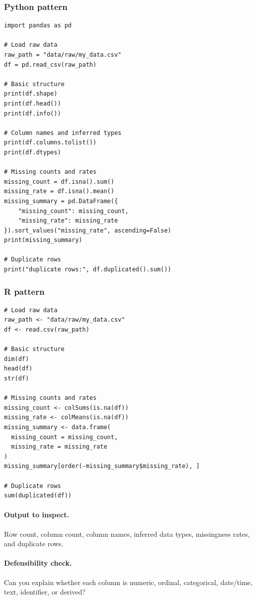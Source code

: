 \subsubsection*{Python pattern}

\begin{verbatim}
import pandas as pd

# Load raw data
raw_path = "data/raw/my_data.csv"
df = pd.read_csv(raw_path)

# Basic structure
print(df.shape)
print(df.head())
print(df.info())

# Column names and inferred types
print(df.columns.tolist())
print(df.dtypes)

# Missing counts and rates
missing_count = df.isna().sum()
missing_rate = df.isna().mean()
missing_summary = pd.DataFrame({
    "missing_count": missing_count,
    "missing_rate": missing_rate
}).sort_values("missing_rate", ascending=False)
print(missing_summary)

# Duplicate rows
print("duplicate rows:", df.duplicated().sum())
\end{verbatim}

\subsubsection*{R pattern}

\begin{verbatim}
# Load raw data
raw_path <- "data/raw/my_data.csv"
df <- read.csv(raw_path)

# Basic structure
dim(df)
head(df)
str(df)

# Missing counts and rates
missing_count <- colSums(is.na(df))
missing_rate <- colMeans(is.na(df))
missing_summary <- data.frame(
  missing_count = missing_count,
  missing_rate = missing_rate
)
missing_summary[order(-missing_summary$missing_rate), ]

# Duplicate rows
sum(duplicated(df))
\end{verbatim}

\paragraph{Output to inspect.} Row count, column count, column names, inferred data types, missingness rates, and duplicate rows.

\paragraph{Defensibility check.} Can you explain whether each column is numeric, ordinal, categorical, date/time, text, identifier, or derived?

